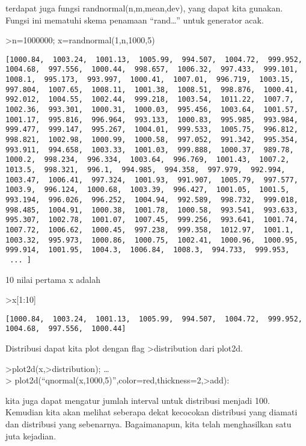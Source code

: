 \documentclass[
]{book}
\begin{document}
terdapat juga fungsi randnormal(n,m,mean,dev), yang dapat kita gunakan. Fungsi ini mematuhi skema penamaan ``rand\ldots{}'' untuk generator acak.

\textgreater n=1000000; x=randnormal(1,n,1000,5)

\begin{verbatim}
[1000.84,  1003.24,  1001.13,  1005.99,  994.507,  1004.72,  999.952,
1004.68,  997.556,  1000.44,  998.657,  1006.32,  997.433,  999.101,
1008.1,  995.173,  993.997,  1000.41,  1007.01,  996.719,  1003.15,
997.804,  1007.65,  1008.11,  1001.38,  1008.51,  998.876,  1000.41,
992.012,  1004.55,  1002.44,  999.218,  1003.54,  1011.22,  1007.7,
1002.36,  993.301,  1000.31,  1000.03,  995.456,  1003.64,  1001.57,
1001.17,  995.816,  996.964,  993.133,  1000.83,  995.985,  993.984,
999.477,  999.147,  995.267,  1004.01,  999.533,  1005.75,  996.812,
998.821,  1002.98,  1000.99,  1000.58,  997.052,  991.342,  995.354,
993.911,  994.658,  1003.33,  1001.03,  999.888,  1000.37,  989.78,
1000.2,  998.234,  996.334,  1003.64,  996.769,  1001.43,  1007.2,
1013.5,  998.321,  996.1,  994.985,  994.358,  997.979,  992.994,
1003.47,  1006.41,  997.324,  1001.93,  991.907,  1005.79,  997.577,
1003.9,  996.124,  1000.68,  1003.39,  996.427,  1001.05,  1001.5,
993.194,  996.026,  996.252,  1004.94,  992.589,  998.732,  999.018,
998.485,  1004.91,  1000.38,  1001.78,  1000.58,  993.541,  993.633,
995.307,  1002.78,  1001.07,  1007.45,  999.256,  993.641,  1001.74,
1007.72,  1006.62,  1000.45,  997.238,  999.358,  1012.97,  1001.1,
1003.32,  995.973,  1000.86,  1000.75,  1002.41,  1000.96,  1000.95,
999.914,  1001.95,  1004.3,  1006.84,  1008.3,  994.733,  999.953,
 ... ]
\end{verbatim}

10 nilai pertama x adalah

\textgreater x{[}1:10{]}

\begin{verbatim}
[1000.84,  1003.24,  1001.13,  1005.99,  994.507,  1004.72,  999.952,
1004.68,  997.556,  1000.44]
\end{verbatim}

Distribusi dapat kita plot dengan flag \textgreater distribution dari plot2d.

\textgreater plot2d(x,\textgreater distribution); \ldots{}\\
\textgreater{} plot2d(``qnormal(x,1000,5)'',color=red,thickness=2,\textgreater add):

kita juga dapat mengatur jumlah interval untuk distribusi menjadi 100. Kemudian kita akan melihat seberapa dekat kecocokan distribusi yang diamati dan distribusi yang sebenarnya. Bagaimanapun, kita telah menghasilkan satu juta kejadian.
\end{document}
